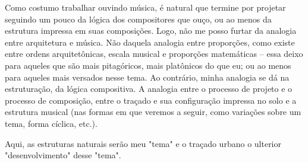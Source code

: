 \documentclass[]{report}
\begin{document}
Como costumo trabalhar ouvindo música, é natural que termine por projetar seguindo um pouco da lógica dos compositores que ouço, ou ao menos da estrutura impressa em suas composições. %
Logo, não me posso furtar da analogia entre arquitetura e música. Não daquela analogia entre proporções, como existe entre ordens arquitetônicas, escala musical e proporções matemáticas – essa deixo para aqueles que são mais pitagóricos, mais platônicos do que eu; ou ao menos para aqueles mais versados nesse tema. Ao contrário, minha analogia se dá na estruturação, da lógica compositiva. A analogia entre o processo de projeto e o processo de composição, entre o traçado e sua configuração impressa no solo e a estrutura musical (nas formas em que veremos a seguir, como variações sobre um tema, forma cíclica, etc.).

Aqui, as estruturas naturais serão meu "tema" e o traçado urbano o ulterior "desenvolvimento" desse "tema".
\end{document}
